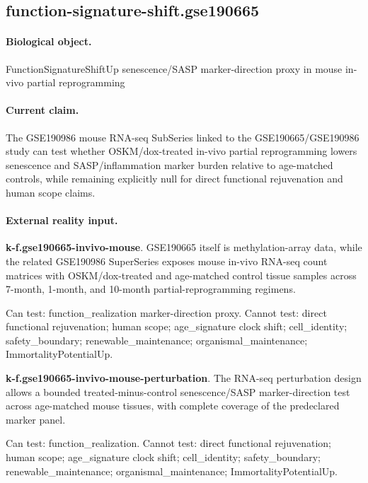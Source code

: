 \subsection{function-signature-shift.gse190665}

\paragraph{Biological object.} FunctionSignatureShiftUp senescence/SASP marker-direction proxy in mouse in-vivo partial reprogramming

\paragraph{Current claim.} The GSE190986 mouse RNA-seq SubSeries linked to the GSE190665/GSE190986 study can test whether OSKM/dox-treated in-vivo partial reprogramming lowers senescence and SASP/inflammation marker burden relative to age-matched controls, while remaining explicitly null for direct functional rejuvenation and human scope claims.

\paragraph{External reality input.}
\textbf{k-f.gse190665-invivo-mouse}. GSE190665 itself is methylation-array data, while the related GSE190986 SuperSeries exposes mouse in-vivo RNA-seq count matrices with OSKM/dox-treated and age-matched control tissue samples across 7-month, 1-month, and 10-month partial-reprogramming regimens.

Can test: function\_realization marker-direction proxy. Cannot test: direct functional rejuvenation; human scope; age\_signature clock shift; cell\_identity; safety\_boundary; renewable\_maintenance; organismal\_maintenance; ImmortalityPotentialUp.

\textbf{k-f.gse190665-invivo-mouse-perturbation}. The RNA-seq perturbation design allows a bounded treated-minus-control senescence/SASP marker-direction test across age-matched mouse tissues, with complete coverage of the predeclared marker panel.

Can test: function\_realization. Cannot test: direct functional rejuvenation; human scope; age\_signature clock shift; cell\_identity; safety\_boundary; renewable\_maintenance; organismal\_maintenance; ImmortalityPotentialUp.


